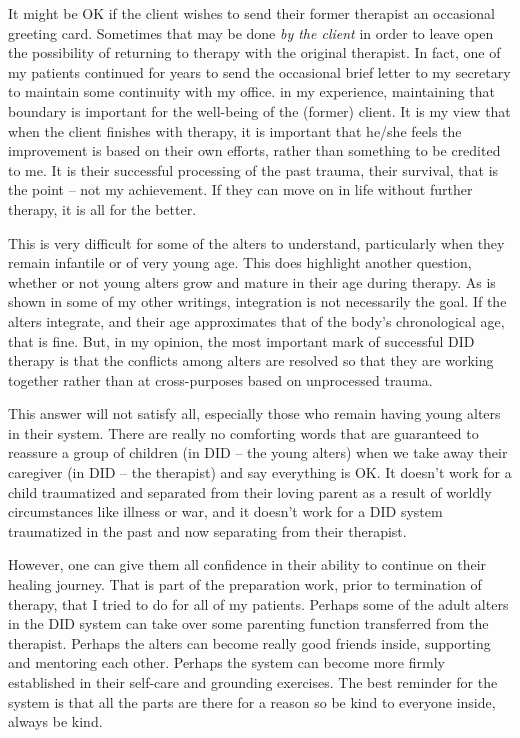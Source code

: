 \documentclass[]{book}
\begin{document}
It might be OK if the client wishes to send their former therapist an occasional greeting card. Sometimes that may be done \emph{by the client} in order to leave open the possibility of returning to therapy with the original therapist. In fact, one of my patients continued for years to send the occasional brief letter to my secretary to maintain some continuity with my office. in my experience, maintaining that boundary is important for the well-being of the (former) client. It is my view that when the client finishes with therapy, it is important that he/she feels the improvement is based on their own efforts, rather than something to be credited to me. It is their successful processing of the past trauma, their survival, that is the point -- not my achievement. If they can move on in life without further therapy, it is all for the better.

This is very difficult for some of the alters to understand, particularly when they remain infantile or of very young age. This does highlight another question, whether or not young alters grow and mature in their age during therapy. As is shown in some of my other writings, integration is not necessarily the goal. If the alters integrate, and their age approximates that of the body's chronological age, that is fine. But, in my opinion, the most important mark of successful DID therapy is that the conflicts among alters are resolved so that they are working together rather than at cross-purposes based on unprocessed trauma.

This answer will not satisfy all, especially those who remain having young alters in their system. There are really no comforting words that are guaranteed to reassure a group of children (in DID -- the young alters) when we take away their caregiver (in DID -- the therapist) and say everything is OK. It doesn't work for a child traumatized and separated from their loving parent as a result of worldly circumstances like illness or war, and it doesn't work for a DID system traumatized in the past and now separating from their therapist.

However, one can give them all confidence in their ability to continue on their healing journey. That is part of the preparation work, prior to termination of therapy, that I tried to do for all of my patients. Perhaps some of the adult alters in the DID system can take over some parenting function transferred from the therapist. Perhaps the alters can become really good friends inside, supporting and mentoring each other. Perhaps the system can become more firmly established in their self-care and grounding exercises. The best reminder for the system is that all the parts are there for a reason so be kind to everyone inside, always be kind.
\end{document}
